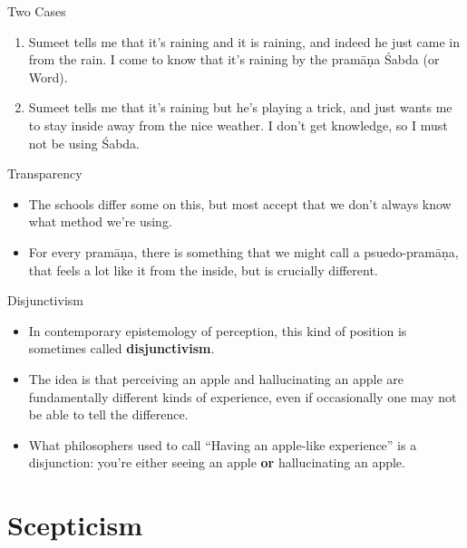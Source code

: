 \documentclass[
  17pt,
  letterpaper,
  ignorenonframetext,
  aspectratio=169,
  handout]{beamer}
\providecommand{\tightlist}{%
  \setlength{\itemsep}{0pt}\setlength{\parskip}{0pt}}\usepackage{longtable,booktabs,array}
\begin{document}
\begin{frame}{Two Cases}
\protect\hypertarget{two-cases}{}
\begin{enumerate}[<+->]
\tightlist
\item
  Sumeet tells me that it's raining and it is raining, and indeed he
  just came in from the rain. I come to know that it's raining by the
  pramāṇa Śabda (or Word).
\item
  Sumeet tells me that it's raining but he's playing a trick, and just
  wants me to stay inside away from the nice weather. I don't get
  knowledge, so I must not be using Śabda.
\end{enumerate}
\end{frame}

\begin{frame}{Transparency}
\protect\hypertarget{transparency}{}
\begin{itemize}[<+->]
\tightlist
\item
  The schools differ some on this, but most accept that we don't always
  know what method we're using.
\item
  For every pramāṇa, there is something that we might call a
  psuedo-pramāṇa, that feels a lot like it from the inside, but is
  crucially different.
\end{itemize}
\end{frame}

\begin{frame}{Disjunctivism}
\protect\hypertarget{disjunctivism}{}
\begin{itemize}[<+->]
\tightlist
\item
  In contemporary epistemology of perception, this kind of position is
  sometimes called \textbf{disjunctivism}.
\item
  The idea is that perceiving an apple and hallucinating an apple are
  fundamentally different kinds of experience, even if occasionally one
  may not be able to tell the difference.
\item
  What philosophers used to call ``Having an apple-like experience'' is
  a disjunction: you're either seeing an apple \textbf{or} hallucinating
  an apple.
\end{itemize}
\end{frame}

\hypertarget{scepticism}{%
\section{Scepticism}\label{scepticism}}
\end{document}
